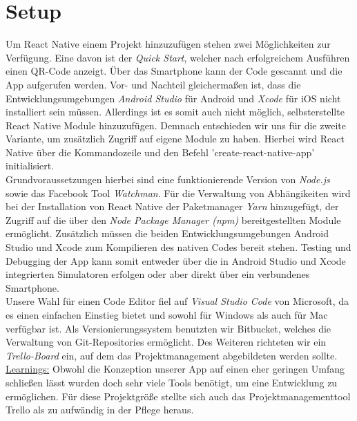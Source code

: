 \section{Setup}
Um React Native einem Projekt hinzuzufügen stehen zwei Möglichkeiten zur Verfügung.
Eine davon ist der \emph{Quick Start}, welcher nach erfolgreichem Ausführen einen QR-Code anzeigt.
Über das Smartphone kann der Code gescannt und die App aufgerufen werden.
Vor- und Nachteil gleichermaßen ist, dass die Entwicklungsumgebungen \emph{Android Studio} für Android und \emph{Xcode} für iOS nicht installiert sein müssen.
Allerdings ist es somit auch nicht möglich, selbsterstellte React Native Module hinzuzufügen.
Demnach entschieden wir uns für die zweite Variante, um zusätzlich Zugriff auf eigene Module zu haben.
Hierbei wird React Native über die Kommandozeile und den Befehl 'create-react-native-app' initialisiert.
\\
Grundvoraussetzungen hierbei sind eine funktionierende Version von \emph{Node.js} sowie das Facebook Tool \emph{Watchman}.
Für die Verwaltung von Abhängikeiten wird bei der Installation von React Native der Paketmanager \emph{Yarn} hinzugefügt, der Zugriff auf die über den \emph{Node Package Manager (npm)} bereitgestellten Module ermöglicht.
Zusätzlich müssen die beiden Entwicklungsumgebungen Android Studio und Xcode zum Kompilieren des nativen Codes bereit stehen.
Testing und Debugging der App kann somit entweder über die in Android Studio und Xcode integrierten Simulatoren erfolgen oder aber direkt über ein verbundenes Smartphone.
\\
Unsere Wahl für einen Code Editor fiel auf \emph{Visual Studio Code} von Microsoft, da es einen einfachen Einstieg bietet und sowohl für Windows als auch für Mac verfügbar ist.
Als Versionierungssystem benutzten wir Bitbucket, welches die Verwaltung von Git-Repositories ermöglicht.
Des Weiteren richteten wir ein \emph{Trello-Board} ein, auf dem das Projektmanagement abgebildeten werden sollte.
\\
\underline{Learnings:}
Obwohl die Konzeption unserer App auf einen eher geringen Umfang schließen lässt wurden doch sehr viele Tools benötigt, um eine Entwicklung zu ermöglichen.
Für diese Projektgröße stellte sich auch das Projektmanagementtool Trello als zu aufwändig in der Pflege heraus.



